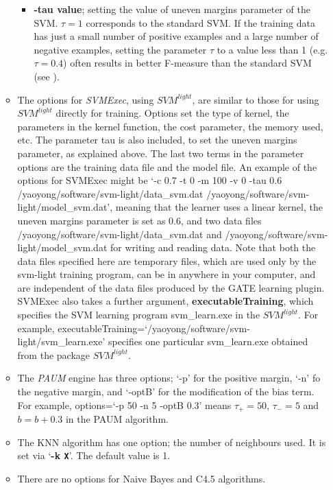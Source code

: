 \begin{itemize}
\begin{itemize}
\begin{itemize}
\item {\bf -tau value}; setting the value of uneven margins parameter of the SVM.
$\tau=1$ corresponds to the standard SVM. If the training data has just a small
number of positive examples and a large number of negative examples, setting the
parameter $\tau$ to a value less than 1 (e.g. $\tau=0.4$) often results in
better F-measure than the standard SVM (see \cite{Yaoyong03}).

\end{itemize}

\item The options for {\em SVMExec}, using $SVM^{light}$, are similar to those
for using $SVM^{light}$ directly for training. Options set the type of kernel, the
parameters in the kernel function, the cost parameter, the memory used, etc. The
parameter tau is also included, to set the uneven margins parameter, as explained
above. The last two terms in the parameter options are the training data file and
the model file. An example of the options for SVMExec might be `-c 0.7 -t 0 -m
100 -v 0 -tau 0.6 /yaoyong/software/svm-light/data\_svm.dat
/yaoyong/software/svm-light/model\_svm.dat', meaning that the learner uses a
linear kernel, the uneven margins parameter is set as 0.6, and two data files
/yaoyong/software/svm-light/data\_svm.dat and
/yaoyong/software/svm-light/model\_svm.dat for writing and reading data. Note
that both the data files specified here are temporary files, which are used only
by the svm-light training program, can be in anywhere in your computer, and
are independent of the data files produced by the GATE learning plugin. SVMExec also
takes a further argument, {\bf executableTraining}, which specifies the SVM
learning program svm\_learn.exe in the $SVM^{light}$. For example,
executableTraining=`/yaoyong/software/svm-light/svm\_learn.exe' specifies one
particular svm\_learn.exe obtained from the package $SVM^{light}$.

\item The {\em PAUM} engine has three options; `-p' for the positive margin,
`-n' fo the negative margin, and `-optB' for the modification of the bias term. For
example, options=`-p 50 -n 5 -optB 0.3' means $\tau_{+}=50$, $\tau_{-}=5$ and
$b = b + 0.3$ in the PAUM algorithm.

\item The KNN algorithm has one option; the number of neighbours used. It is set
via `{\bf -k \texttt{X}}'. The default value is 1.

\item There are no options for Naive Bayes and C4.5 algorithms.

\end{itemize}

\end{itemize}

